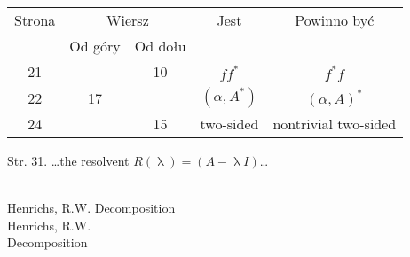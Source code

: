 \documentclass[a4paper,11pt]{article}
\numberwithin{equation}{section}
\renewcommand{\lambda}{\uplambda}
\begin{document}
\begin{center}

  \begin{tabular}{|c|c|c|c|c|}
    \hline
    Strona & \multicolumn{2}{c|}{Wiersz} & Jest
                              & Powinno być \\ \cline{2-3}
    & Od góry & Od dołu & & \\
    \hline
    21  & & 10 & $f f^{ * }$ & $f^{ * } f$ \\
    22  & 17 & & $( \alpha, A^{ * } )$ & $( \alpha, A )^{ * }$ \\
    24  & & 15 & two-sided & nontrivial two-sided \\
    \hline
  \end{tabular}

\end{center}

\VerSpaceSix


Str. 31. \ldots the resolvent $R( \lambda ) = ( A - \lambda I )$\ldots

\noindent
{} \\
\Jest Henrichs, R.W. Decomposition \\
\PowinnoByc Henrichs, R.W. \\
Decomposition \\

















\printbibliography





\end{document}
